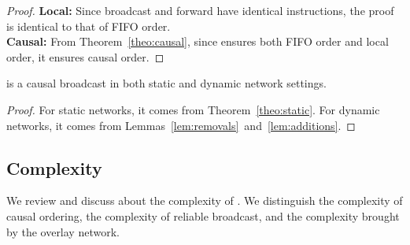 \begin{proof}
  \textbf{Local:} Since broadcast and forward have identical instructions, the
  proof is identical to that of FIFO order. \\
  \textbf{Causal:} From Theorem~\ref{theo:causal}, since \CBROADCAST ensures
  both FIFO order and local order, it ensures causal order.
\end{proof}

\begin{theorem}
  \CBROADCAST is a causal broadcast in both static and dynamic network settings.
\end{theorem}

\begin{proof}
  For static networks, it comes from Theorem~\ref{theo:static}. For dynamic
  networks, it comes from Lemmas~\ref{lem:removals}~and~\ref{lem:additions}.
\end{proof}

\subsection{Complexity}
\label{subsec:complexity}

We review and discuss about the complexity of \CBROADCAST. We distinguish the
complexity of causal ordering, the complexity of reliable broadcast, and the
complexity brought by the overlay network.

